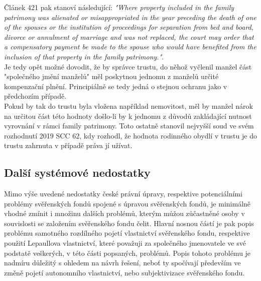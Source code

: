 \documentclass{article}
\begin{document}
Článek 421 pak stanoví následující: \textit{"Where property included in the family patrimony was alienated or misappropriated in the year preceding the death of one of the spouses or the institution of proceedings for separation from bed and board, divorce or annulment of marriage and was not replaced, the court may order that a compensatory payment be made to the spouse who would have benefited from the inclusion of that property in the family patrimony."}.\\

Je tedy opět možné dovodit, že by správce trustu, do něhož vyčlenil manžel část "společného jmění manželů" měl poskytnou jednomu z manželů určité kompenzační plnění. Principiálně se tedy jedná o stejnou ochranu jako v předchozím případě.\\

Pokud by tak do trustu byla vložena například nemovitost, měl by manžel nárok na určitou část této hodnoty došlo-li by k jednomu z důvodů zakládající nutnost vyrovnání v rámci family patrimony. Toto ostatně stanovil nejvyšší soud ve svém rozhodnutí 2019 SCC 62, kdy rozhodl, že hodnota rodinného obydlí v trustu je do trustu zahrnuta v případě práva jí užívat.\\



\subsection{Další systémové nedostatky}

Mimo výše uvedené nedostatky české právní úpravy, respektive potenciálními problémy svěřenských fondů spojené s úpravou svěřenských fondů, je minimálně vhodné zmínit i množinu dalších problémů, kterým můžou zůčastněné osoby v souvislosti se založením svěřenského fondu čelit. Hlavní nosnou částí je pak popis problému samotného rozdílného pojetí vlastnictví svěřenského fondu, respektive použití Lepaullova vlastnictví, které považuji za společného jmenovatele ve své podstatě veškerých, v této části popsaných, problémů. Popis tohoto problému je nadmíru důležitý s ohledem na návrh řešení, neboť ty spočívají především ve změně pojetí autonomního vlastnictví, nebo subjektivizace svěřenského fondu.\\
\end{document}
